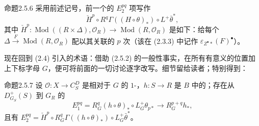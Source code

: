 \begin{SGAresult}{命题}{2.5.6}
采用前述记号，前一个的 $E_2^{pq}$ 项写作
\[
\check H^p\circ R^q\Gamma((H\circ\theta)_*)\circ L^+\bar\theta^*,
\]
其中 $\check H^p:\operatorname{Mod}((R\times\Delta),\mathcal O_R)\to\operatorname{Mod}(R,\mathcal O_R)$ 是如下：给每个 $\Delta\xrightarrow{F}\operatorname{Mod}(R,\mathcal O_R)$ 配以其关联的 $p$ 次（该在 (2.3.3) 中记作 $\varepsilon_{Z^\bullet*}(F)^\bullet$）。
\end{SGAresult}
现在回到 (2.4) 引入的术语：借助 (2.5.2) 的一般性事实，在所有有意义的位置加上下标字母 $G$，便可将前面的一切讨论逐字改写。细节留给读者；特别得到：
\begin{SGAresult}{命题}{2.5.7}
设 $\mathcal O:X\to C_S^D$ 是相对于 $G$ 的 $1$-，$h:S\to R$ 是 $B$ 中的；存在从 $D^+_{G_S}(S)$ 到 $G_R$ 的
\[
E_1^{pq}=R_G^q(h\circ\theta)_*\circ L_G^+\theta_{p*}
\longrightarrow R_G^{p+q}h_*,
\]
且有 $E_2^{pq}=\check H^p\circ R_G^q\Gamma((h\circ\theta)_*)\circ L_G^+\bar\theta^*$。
\end{SGAresult}

